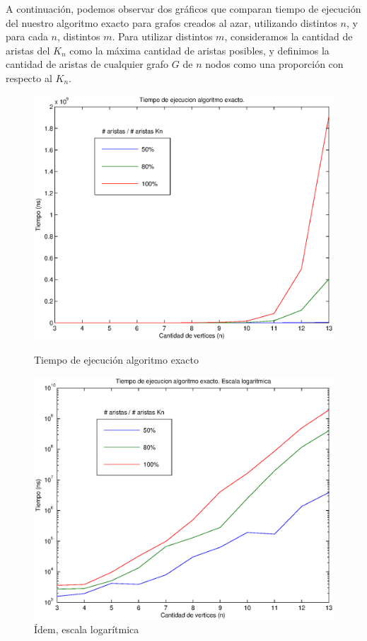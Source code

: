 A continuación, podemos observar dos gráficos que comparan tiempo de ejecución del nuestro algoritmo exacto para grafos creados al azar, utilizando distintos $n$, y para cada $n$, distintos $m$. Para utilizar distintos $m$, consideramos la cantidad de aristas del $K_n$ como la máxima cantidad de aristas posibles, y definimos la cantidad de aristas de cualquier grafo $G$ de $n$ nodos como una proporción con respecto al $K_n$.

\begin{figure}[H]
  \begin{minipage}{0.5\linewidth}
    \includegraphics[width=\linewidth]{graficos/exacto_tiempo.eps}
    \caption{Tiempo de ejecución algoritmo exacto}\label{fig:exacto-tiempo}
  \end{minipage}
  \hfill
  \begin{minipage}{0.5\linewidth}
    \includegraphics[width=\linewidth]{graficos/exacto_tiempo_log.eps}
    \caption{Ídem, escala logarítmica}\label{fig:exacto-tiempo-log}
  \end{minipage}
\end{figure}

